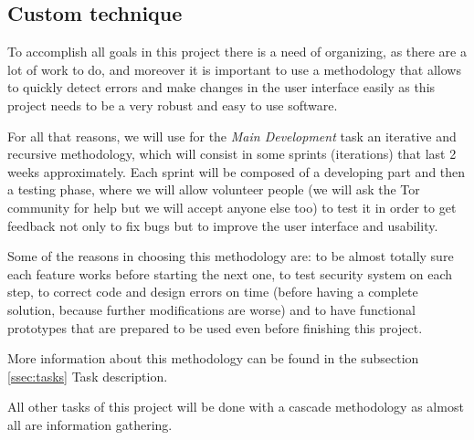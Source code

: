 \subsection{Custom technique}
To accomplish all goals in this project there is a need of organizing, as there are a lot of work to do, and moreover it is important to use a methodology that allows to quickly detect errors and make changes in the user interface easily as this project needs to be a very robust and easy to use software.

For all that reasons, we will use for the \textit{Main Development} task an iterative and recursive methodology, which will consist in some sprints (iterations) that last 2 weeks approximately. Each sprint will be composed of a developing part and then a testing phase, where we will allow volunteer people (we will ask the Tor community for help but we will accept anyone else too) to test it in order to get feedback not only to fix bugs but to improve the user interface and usability. 

Some of the reasons in choosing this methodology are: to be almost totally sure each feature works before starting the next one, to test security system on each step, to correct code and design errors on time (before having a complete solution, because further modifications are worse) and to have functional prototypes that are prepared to be used even before finishing this project. 

More information about this methodology can be found in the subsection \ref{ssec:tasks} Task description.

All other tasks of this project will be done with a cascade methodology as almost all are information gathering.
